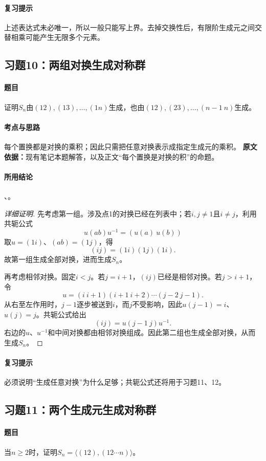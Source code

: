 \paragraph{复习提示}上述表达式未必唯一，所以一般只能写上界。去掉交换性后，有限阶生成元之间交替相乘可能产生无限多个元素。

\subsection{习题10：两组对换生成对称群}
\paragraph{题目}证明$S_n$由$(12),(13),\ldots,(1n)$生成，也由$(12),(23),\ldots,(n-1\ n)$生成。
\paragraph{考点与思路}每个置换都是对换的乘积；因此只需把任意对换表示成指定生成元的乘积。
\textbf{原文依据：}现有笔记本题解答，以及正文“每个置换是对换的积”的命题。
\paragraph{所用结论}、。
\begin{proof}[详细证明]
先考虑第一组。涉及点1的对换已经在列表中；若$i,j\ne1$且$i\ne j$，利用共轭公式
\[
u(ab)u^{-1}=(u(a)\ u(b))
\]
取$u=(1i)$、$(ab)=(1j)$，得
\[
(ij)=(1i)(1j)(1i).
\]
故第一组生成全部对换，进而生成$S_n$。

再考虑相邻对换。固定$i<j$。若$j=i+1$，$(ij)$已经是相邻对换。若$j>i+1$，令
\[
u=(i\ i+1)(i+1\ i+2)\cdots(j-2\ j-1).
\]
从右至左作用时，$j-1$逐步被送到$i$，而$j$不受影响，因此$u(j-1)=i$、$u(j)=j$。共轭公式给出
\[
(ij)=u(j-1\ j)u^{-1}.
\]
右边的$u$、$u^{-1}$和中间对换都由相邻对换组成。因此第二组也生成全部对换，从而生成$S_n$。
\end{proof}
\paragraph{复习提示}必须说明“生成任意对换”为什么足够；共轭公式还将用于习题11、12。

\subsection{习题11：两个生成元生成对称群}
\paragraph{题目}当$n\ge2$时，证明$S_n=\langle(12),(12\cdots n)\rangle$。
